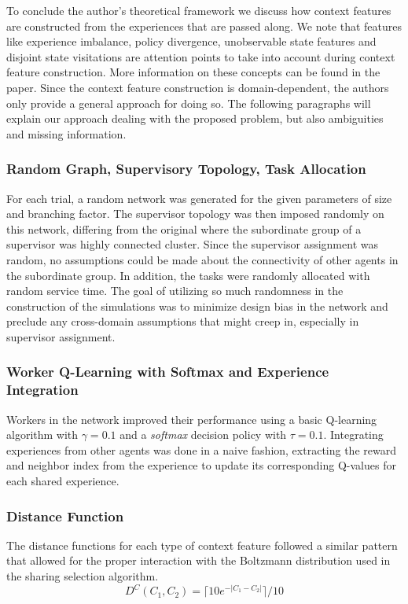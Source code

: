 \documentclass[letterpaper]{article}
\begin{document}
To conclude the author’s theoretical framework we discuss how context features are constructed from the experiences that are passed along. We note that features like experience imbalance, policy divergence, unobservable state features and disjoint state visitations are attention points to take into account during context feature construction. More information on these concepts can be found in the paper. Since the context feature construction is domain-dependent, the authors only provide a general approach for doing so. The following paragraphs will explain our approach dealing with the proposed problem, but also ambiguities and missing information.

\subsubsection{Random Graph, Supervisory Topology, Task Allocation}
For each trial, a random network was generated for the given parameters of size and branching factor.  The supervisor topology was then imposed randomly on this network, differing from the original where the subordinate group of a supervisor was highly connected cluster.  Since the supervisor assignment was random, no assumptions could be made about the connectivity of other agents in the subordinate group.  In addition, the tasks were randomly allocated with random service time.  The goal of utilizing so much randomness in the construction of the simulations was to minimize design bias in the network and preclude any cross-domain assumptions that might creep in, especially in supervisor assignment.

\subsubsection{Worker Q-Learning with Softmax and Experience Integration}
Workers in the network improved their performance using a basic Q-learning algorithm with $\gamma = 0.1$ and a \textit{softmax} decision policy with $\tau = 0.1$.  Integrating experiences from other agents was done in a naive fashion, extracting the reward and neighbor index from the experience to update its corresponding Q-values for each shared experience.

\subsubsection{Distance Function}
The distance functions for each type of context feature followed a similar pattern that allowed for the proper interaction with the Boltzmann distribution used in the sharing selection algorithm.
\[D^C(C_1, C_2) = \lceil 10e^{-| C_1 - C_2 |} \rceil / 10\]
\end{document}
